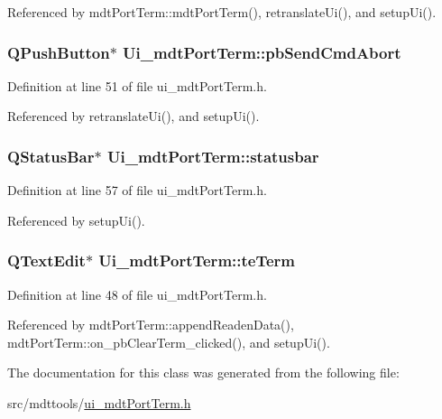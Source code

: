 Referenced by mdt\-Port\-Term\-::mdt\-Port\-Term(), retranslate\-Ui(), and setup\-Ui().

\hypertarget{class_ui__mdt_port_term_ae9022bd16347f0acd8b45c58a23a6d8c}{
\subsubsection[{pb\-Send\-Cmd\-Abort}]{\setlength{\rightskip}{0pt plus 5cm}Q\-Push\-Button$\ast$ Ui\-\_\-mdt\-Port\-Term\-::pb\-Send\-Cmd\-Abort}}\label{class_ui__mdt_port_term_ae9022bd16347f0acd8b45c58a23a6d8c}


Definition at line 51 of file ui\-\_\-mdt\-Port\-Term.\-h.



Referenced by retranslate\-Ui(), and setup\-Ui().

\hypertarget{class_ui__mdt_port_term_ae922f4e6f3b8aa1db954038b8e335254}{
\subsubsection[{statusbar}]{\setlength{\rightskip}{0pt plus 5cm}Q\-Status\-Bar$\ast$ Ui\-\_\-mdt\-Port\-Term\-::statusbar}}\label{class_ui__mdt_port_term_ae922f4e6f3b8aa1db954038b8e335254}


Definition at line 57 of file ui\-\_\-mdt\-Port\-Term.\-h.



Referenced by setup\-Ui().

\hypertarget{class_ui__mdt_port_term_aa4f5b47fb9c324397b9608af1c6e6967}{
\subsubsection[{te\-Term}]{\setlength{\rightskip}{0pt plus 5cm}Q\-Text\-Edit$\ast$ Ui\-\_\-mdt\-Port\-Term\-::te\-Term}}\label{class_ui__mdt_port_term_aa4f5b47fb9c324397b9608af1c6e6967}


Definition at line 48 of file ui\-\_\-mdt\-Port\-Term.\-h.



Referenced by mdt\-Port\-Term\-::append\-Readen\-Data(), mdt\-Port\-Term\-::on\-\_\-pb\-Clear\-Term\-\_\-clicked(), and setup\-Ui().



The documentation for this class was generated from the following file\-:\begin{DoxyCompactItemize}
\item 
src/mdttools/\hyperlink{ui__mdt_port_term_8h}{ui\-\_\-mdt\-Port\-Term.\-h}\end{DoxyCompactItemize}
